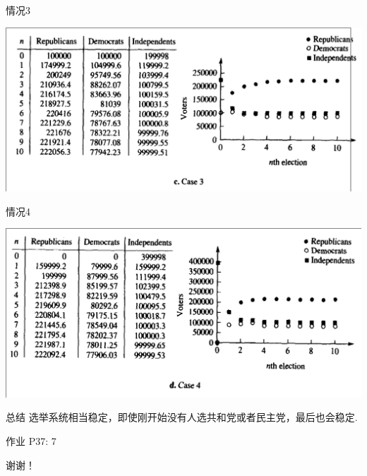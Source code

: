 \documentclass{beamer}
\begin{document}
\begin{frame}{情况3}
  \begin{center}
    \includegraphics[width=.9\textwidth{}]{party-3.png}
  \end{center}  
\end{frame}

\begin{frame}{情况4}
  \begin{center}
    \includegraphics[width=.9\textwidth{}]{party-4.png}
  \end{center}  
\end{frame}

\begin{frame}{总结}
选举系统相当稳定，即使刚开始没有人选共和党或者民主党，最后也会稳定.
  
\end{frame}

\begin{frame}{作业}
  P37: 7


  谢谢！
\end{frame}
\end{document}

